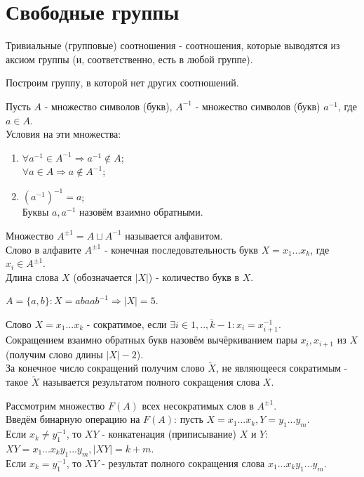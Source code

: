 \section{Свободные группы}
\begin{definition}
    Тривиальные (групповые) соотношения - соотношения, которые выводятся из аксиом группы (и, соответственно, есть в любой группе).
\end{definition}
Построим группу, в которой нет других соотношений.
\begin{definition}
    Пусть $A$ - множество символов (букв), $A^{-1}$ - множество символов (букв) $a^{-1}$, где $a \in A$.\\
    Условия на эти множества:
    \begin{enumerate}
        \item $\forall a^{-1} \in A^{-1} \Longrightarrow a^{-1} \notin A$;\\
        $\forall a \in A \Longrightarrow a \notin A^{-1}$;
        \item $(a^{-1})^{-1} = a$;\\
        Буквы $a, a^{-1}$ назовём взаимно обратными.
    \end{enumerate}
Множество $A^{\pm 1} = A \sqcup A^{-1}$ называется алфавитом.\\
Слово в алфавите $A^{\pm 1}$ - конечная последовательность букв $X = x_1...x_k$, где $x_i \in A^{\pm 1}$.\\
Длина слова $X$ (обозначается $|X|$) - количество букв в $X$.
\end{definition}
\begin{example}
    $A = \{a, b\}: X = abaab^{-1} \Rightarrow |X| = 5$.
\end{example} 
\begin{definition}
    Слово $X = x_1...x_k$ - сократимое, если $\exists i \in \overline{1,..,k-1}: x_i = x^{-1}_{i+1}$.\\
    Сокращением взаимно обратных букв назовём вычёркиванием пары $x_i, x_{i+1}$ из $X$ (получим слово длины $|X| - 2$).\\
    За конечное число сокращений получим слово $\tilde{X}$, не являющееся сократимым - такое $\tilde{X}$ называется результатом полного сокращения слова $X$.
\end{definition}
\begin{definition}
    Рассмотрим множество $F(A)$ всех несократимых слов в $A^{\pm 1}$.\\
    Введём бинарную операцию на $F(A)$: пусть $X = x_1...x_k, Y = y_1...y_m$.\\
    Если $x_k \neq y_1^{-1}$, то $XY$ - конкатенация (приписывание) $X$ и $Y$:\\
    $XY = x_1...x_ky_1...y_m, |XY| = k+m$.\\
    Если $x_k = y_1^{-1}$, то $XY$ - результат полного сокращения слова $x_1...x_ky_1...y_m$.
\end{definition}
